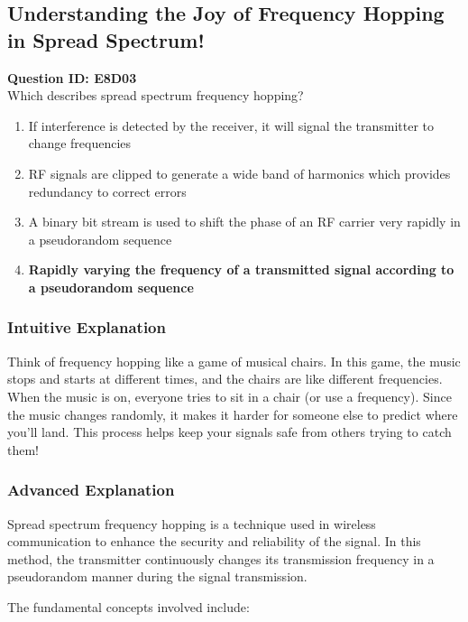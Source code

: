 \subsection{Understanding the Joy of Frequency Hopping in Spread Spectrum!}

\begin{tcolorbox}[colback=blue!10!white, colframe=blue!80!black, title=E8D03]
    \textbf{Question ID: E8D03} \\
    Which describes spread spectrum frequency hopping? \\
    \begin{enumerate}[label=\Alph*.]
        \item If interference is detected by the receiver, it will signal the transmitter to change frequencies
        \item RF signals are clipped to generate a wide band of harmonics which provides redundancy to correct errors
        \item A binary bit stream is used to shift the phase of an RF carrier very rapidly in a pseudorandom sequence
        \item \textbf{Rapidly varying the frequency of a transmitted signal according to a pseudorandom sequence}
    \end{enumerate}
\end{tcolorbox}

\subsubsection{Intuitive Explanation}
Think of frequency hopping like a game of musical chairs. In this game, the music stops and starts at different times, and the chairs are like different frequencies. When the music is on, everyone tries to sit in a chair (or use a frequency). Since the music changes randomly, it makes it harder for someone else to predict where you'll land. This process helps keep your signals safe from others trying to catch them!

\subsubsection{Advanced Explanation}
Spread spectrum frequency hopping is a technique used in wireless communication to enhance the security and reliability of the signal. In this method, the transmitter continuously changes its transmission frequency in a pseudorandom manner during the signal transmission.

The fundamental concepts involved include:

